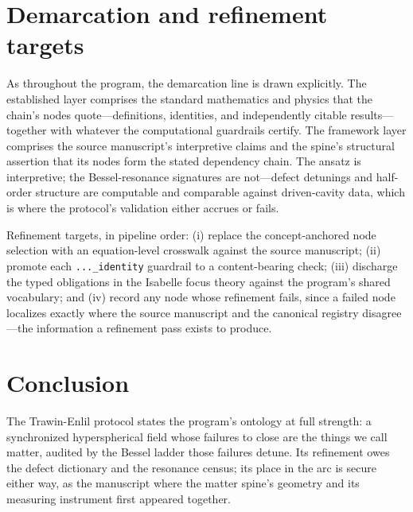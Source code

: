 \documentclass[11pt]{article}
\theoremstyle{remark}
\begin{document}
\section{Demarcation and refinement targets}
\label{sec:demarc}

As throughout the program, the demarcation line is drawn explicitly. The established layer comprises the standard mathematics and physics that the chain's nodes quote---definitions, identities, and independently citable results---together with whatever the computational guardrails certify. The framework layer comprises the source manuscript's interpretive claims and the spine's structural assertion that its nodes form the stated dependency chain. The ansatz is interpretive; the Bessel-resonance signatures are not---defect detunings and half-order structure are computable and comparable against driven-cavity data, which is where the protocol's validation either accrues or fails.

Refinement targets, in pipeline order: (i) replace the concept-anchored node selection with an equation-level crosswalk against the source manuscript; (ii) promote each \texttt{...\_identity} guardrail to a content-bearing check; (iii) discharge the typed obligations in the Isabelle focus theory against the program's shared vocabulary; and (iv) record any node whose refinement fails, since a failed node localizes exactly where the source manuscript and the canonical registry disagree---the information a refinement pass exists to produce.

\section{Conclusion}
\label{sec:conc}

The Trawin-Enlil protocol states the program's ontology at full strength: a synchronized hyperspherical field whose failures to close are the things we call matter, audited by the Bessel ladder those failures detune. Its refinement owes the defect dictionary and the resonance census; its place in the arc is secure either way, as the manuscript where the matter spine's geometry and its measuring instrument first appeared together.
\end{document}
